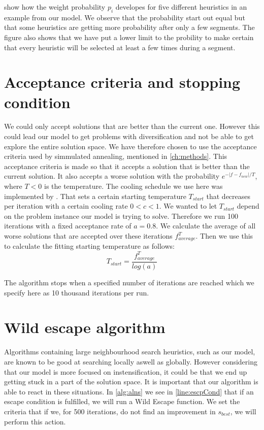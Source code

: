 \documentclass[../main.tex]{subfiles}
\begin{document}
 show how the weight probability $p_i$ developes for five different heuristics in an example from our model. 
We observe that the probability start out equal but that some heuristics are getting more probability after only a few segments.
The figure also shows that we have put a lower limit to the probility to make certain that every heuristic will be selected at least a few times during a segment.

\section{Acceptance criteria and stopping condition}
\label{sec:accept}
We could only accept solutions that are better than the current one.
However this could lead our model to get problems with diversification and not be able to get explore the entire solution space. 
We have therefore chosen to use the acceptance criteria used by simmulated annealing, mentioned in \cref{ch:methods}. 
This acceptance criteria is made so that it accepts a solution that is better than the current solution. It also accepts a worse solution with the probability $e^{-|f-f_{new}|/T}$, where $T<0$ is the temperature. 
The cooling schedule we use here was implemented by \cite{crama03}. That sets a certain starting temperature $T_{start}$ that decreases per iteration with a certain cooling rate $0<c<1$.
We wanted to let $T_{start}$ depend on the problem instance our model is trying to solve. Therefore we run 100 iterations with a fixed acceptance rate of $a = 0.8$. 
We calculate the average of all worse solutions that are accepted over these iterations $f^T_{average}$.  
Then we use this to calculate the fitting starting temperature as follows:
\begin{equation}\label{eq:startTemp}
    T_{start} = \dfrac{f^T_{average}}{log(a)}
\end{equation}

The algorithm stops when a specified number of iterations are reached which we specify here as 10 thousand iterations per run.

\section{Wild escape algorithm}
\label{sec:wild}
Algorithms containing large neighbourhood search heuristics, such as our model, are known to be good at searching locally aswell as globally. 
However considering that our model is more focused on instensification, it could be that we end up getting stuck in a part of the solution space. It is important that our algorithm is able to react in these situations.
In \cref{alg:alns} we see in \cref{line:escpCond} that if an escape condition is fulfilled, we will run a Wild Escape function. 
We set the criteria that if we, for 500 iterations, do not find an improvement in $s_{best}$, we will perform this action.
\end{document}
